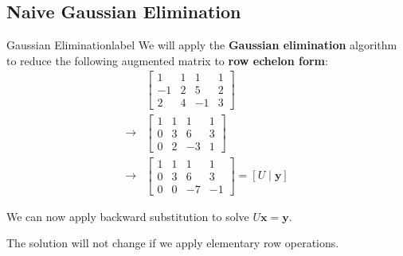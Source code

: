 \subsection{Naive Gaussian Elimination}
\begin{ex}{Gaussian Elimination}{label}
	We will apply the \textbf{Gaussian elimination} algorithm to reduce the following augmented matrix to \textbf{row echelon form}:
	\begin{align*}
		&\left[\begin{array}{ccc|c}
		1 & 1 & 1 & 1 \\
		-1 & 2 & 5 & 2 \\
		2 & 4 & -1 & 3
		\end{array}\right] \\
		\rightarrow &\left[\begin{array}{ccc|c}
		1 & 1 & 1 & 1 \\
		0 & 3 & 6 & 3 \\
		0 & 2 & -3 & 1
		\end{array}\right] \\
		\rightarrow &\left[\begin{array}{ccc|c}
		1 & 1 & 1 & 1 \\
		0 & 3 & 6 & 3 \\
		0 & 0 & -7 & -1
		\end{array}\right]=[U \mid \mathbf{y}]
	\end{align*}


	We can now apply backward substitution to solve $U \mathbf{x} = \mathbf{y}$.
\end{ex}

\begin{marginfigure}
	The solution will not change if we apply elementary row operations.
\end{marginfigure}

\begin{algorithm}
	  \caption{Improved Forward Elimination}\label{improvedForwardSubstitution}
\end{algorithm}

